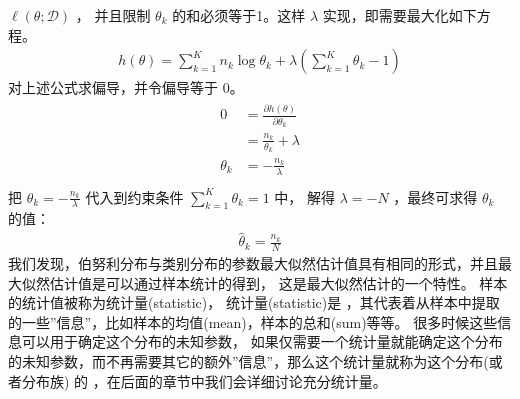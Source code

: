 \documentclass[letterpaper,10pt,english]{sphinxmanual}
\begin{document}
\(\ell(\theta;\mathcal{D} )\) ，
并且限制 \(\theta_k\) 的和必须等于1。这样 
\(\lambda\) 实现，即需要最大化如下方程。
\begin{equation}\label{equation:最大似然估计/content:最大似然估计/content:14}
\begin{split}h(\theta) = \sum_{k=1}^K {n_k} \log \theta_k + \lambda ( \sum_{k=1}^K \theta_k -1)\end{split}
\end{equation}
对上述公式求偏导，并令偏导等于 \(0\)。
\begin{align}\label{equation:最大似然估计/content:最大似然估计/content:15}\!\begin{aligned}
0 &=\frac{\partial h(\theta) }{\partial \theta_k}\\
&= \frac{n_k}{\theta_k} + \lambda\\
\theta_k &= - \frac{n_k}{\lambda}\\
\end{aligned}\end{align}
把 \(\theta_k = - \frac{n_k}{\lambda}\) 代入到约束条件 \(\sum_{k=1}^K \theta_k=1\) 中，
解得 \(\lambda = -N\) ，最终可求得 \(\theta_k\) 的值：
\begin{equation}\label{equation:最大似然估计/content:最大似然估计/content:16}
\begin{split}\hat{\theta}_k =  \frac{n_k}{N}\end{split}
\end{equation}
我们发现，伯努利分布与类别分布的参数最大似然估计值具有相同的形式，并且最大似然估计值是可以通过样本统计的得到，
这是最大似然估计的一个特性。
样本的统计值被称为统计量(statistic)，
统计量(statistic)是 ，其代表着从样本中提取的一些”信息”，比如样本的均值(mean)，样本的总和(sum)等等。
很多时候这些信息可以用于确定这个分布的未知参数，
如果仅需要一个统计量就能确定这个分布的未知参数，而不再需要其它的额外”信息”，那么这个统计量就称为这个分布(或者分布族)
的  ，在后面的章节中我们会详细讨论充分统计量。
\end{document}
